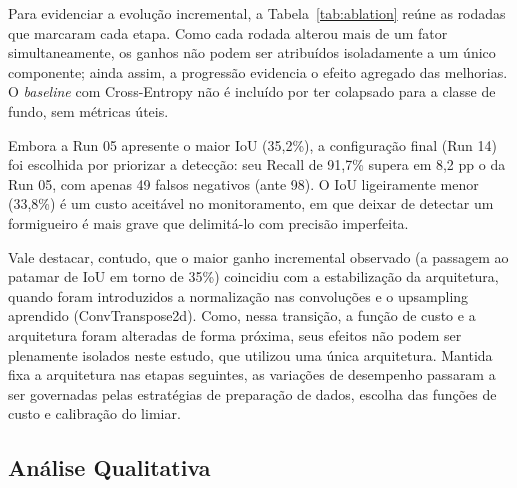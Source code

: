 \documentclass[10pt,a4paper,twocolumn]{article}
\begin{document}
Para evidenciar a evolução incremental, a Tabela~\ref{tab:ablation} reúne as rodadas que marcaram cada etapa. Como cada rodada alterou mais de um fator simultaneamente, os ganhos não podem ser atribuídos isoladamente a um único componente; ainda assim, a progressão evidencia o efeito agregado das melhorias. O \textit{baseline} com Cross-Entropy não é incluído por ter colapsado para a classe de fundo, sem métricas úteis.

\begin{table}[H]
\centering
\caption{Evolução incremental ao longo das rodadas que marcaram cada etapa.}
\label{tab:ablation}
\end{table}

Embora a Run 05 apresente o maior IoU (35,2\%), a configuração final (Run 14) foi escolhida por priorizar a detecção: seu Recall de 91,7\% supera em 8,2 pp o da Run 05, com apenas 49 falsos negativos (ante 98). O IoU ligeiramente menor (33,8\%) é um custo aceitável no monitoramento, em que deixar de detectar um formigueiro é mais grave que delimitá-lo com precisão imperfeita.

Vale destacar, contudo, que o maior ganho incremental observado (a passagem ao patamar de IoU em torno de 35\%) coincidiu com a estabilização da arquitetura, quando foram introduzidos a normalização nas convoluções e o upsampling aprendido (ConvTranspose2d). Como, nessa transição, a função de custo e a arquitetura foram alteradas de forma próxima, seus efeitos não podem ser plenamente isolados neste estudo, que utilizou uma única arquitetura. Mantida fixa a arquitetura nas etapas seguintes, as variações de desempenho passaram a ser governadas pelas estratégias de preparação de dados, escolha das funções de custo e calibração do limiar.

\subsection{Análise Qualitativa}
\end{document}

